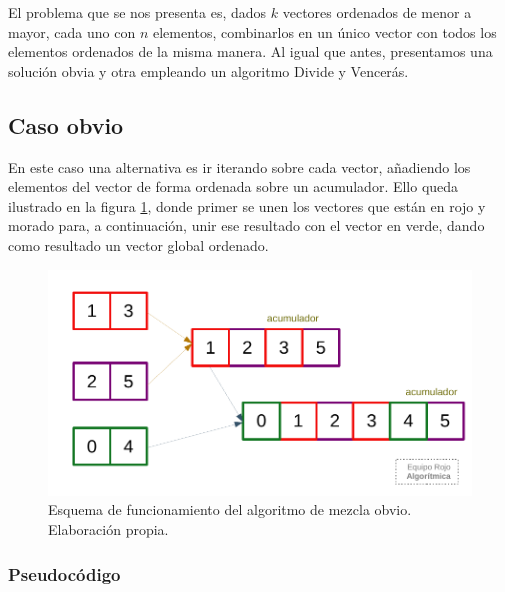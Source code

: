 El problema que se nos presenta es, dados $k$ vectores ordenados de menor a mayor,
cada uno con $n$ elementos, combinarlos en un único vector con todos los elementos
ordenados de la misma manera. Al igual que antes, presentamos una solución obvia y
otra empleando un algoritmo Divide y Vencerás. 

\subsection{Caso obvio}

En este caso una alternativa es ir iterando sobre cada vector, añadiendo los elementos
del vector de forma ordenada sobre un acumulador. Ello queda ilustrado en la figura
\ref{fig:2a-obvio}, donde primer se unen los vectores que están en rojo y morado para,
a continuación, unir ese resultado con el vector en verde, dando como resultado
un vector global ordenado. 

\begin{figure}
    \centering
    \includegraphics[scale=0.87]{img/orden_2a.pdf}
    \caption{Esquema de funcionamiento del algoritmo de 
    mezcla obvio. Elaboración propia.}
    \label{fig:2a-obvio}
\end{figure}

\subsubsection{Pseudocódigo}

